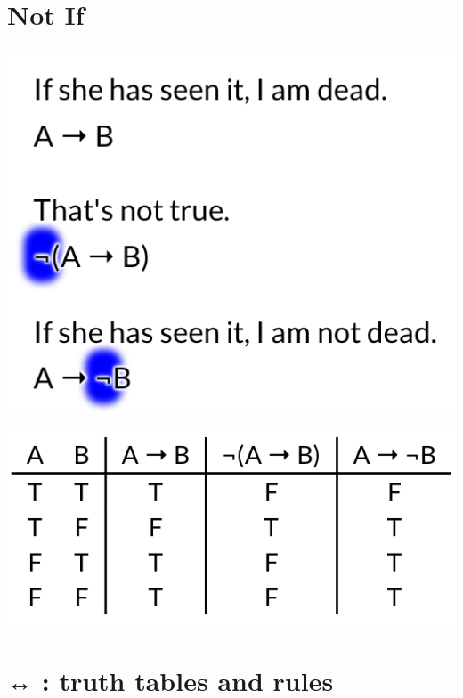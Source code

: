 \documentclass[12pt]{extarticle}
\begin{document}
\begin{multicols*}{3}
 
\section{Not If}
 
\begin{center}
\includegraphics[scale=0.3]{img/not_if.png}
\end{center}
\begin{center}
\includegraphics[scale=0.3]{img/not_if_tt.png}
\end{center}
 
 
\section{↔ : truth tables and rules}
 

\end{multicols*}
\end{document}
